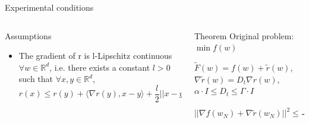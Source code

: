 \documentclass[aspectratio=169, 12pt]{beamer}
\begin{document}
\begin{frame}
\begin{columns}
\begin{column}{0.55\textwidth}
\begin{block}{Experimental conditions}
            \end{block}     

		\end{column}
	\end{columns}


\begin{columns}

	\begin{column}{0.5\textwidth}
		\begin{block}{Assumptions}
    \begin{itemize}
			 \item The gradient of r is l-Lipschitz continuous $\forall w \in \mathbb{R}^d$, i.e. there exists a constant $l > 0$ such that $\forall x, y \in \mathbb{R}^d$,
	\begin{equation*}
		r(x) \leq r(y) + \langle \nabla r(y), x-y \rangle + \frac{l}{2} ||x - y||^2
	\end{equation*}
			\end{itemize}
		\end{block}	
	

	\end{column}
	
	\begin{column}{0.57\textwidth}  
             \begin{block}{Theorem}
                    Original problem: $\min f(w)$
                    
                    $\tilde{F}(w) = f(w) + \tilde{r}(w)$, $\nabla \tilde{r}(w) = D_t \nabla r(w)$, $\alpha \cdot I \leq D_t \leq \Gamma \cdot I$
                    \begin{equation*}
     ||\nabla f(w_N) + \nabla \tilde{r}(w_N)||^2 \leq \dfrac{(\tilde{F}(w_0) - \tilde{F}(w_*))\Gamma}{(\frac{1}{\eta} - \frac{L + l\cdot \alpha}{2\alpha}) \eta^2 (N+1)}     
\end{equation*}
                  \end{block}		

	\end{column}
\end{columns}
\end{frame}
\fi
\end{document}
